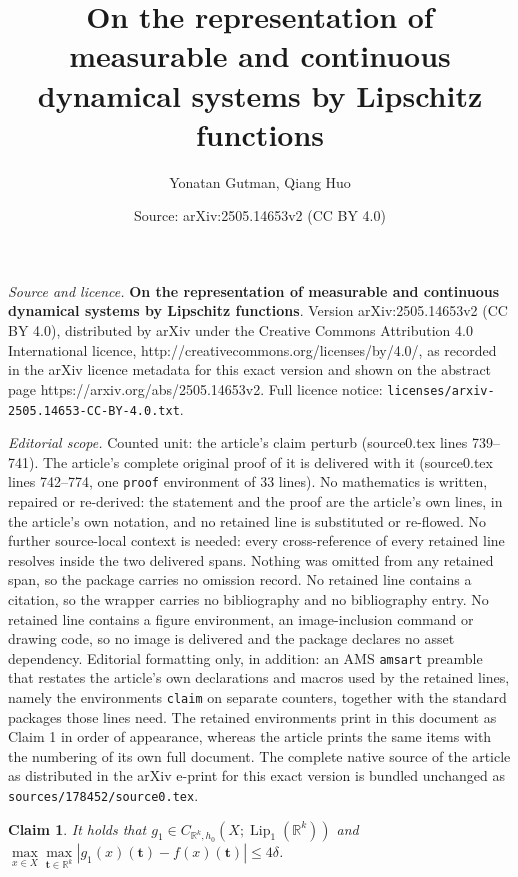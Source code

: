 \documentclass[10pt,a4paper]{amsart}
\title{{ \Large\bf{On the representation of measurable and continuous dynamical systems by Lipschitz functions}}}
\author{Yonatan Gutman, Qiang Huo}
\date{Source: arXiv:2505.14653v2 (CC BY 4.0)}
\newtheorem{claim}{Claim}
\DeclareMathOperator{\Lip}{Lip}
\def\Rk{\mathbb{R}^k}
\def\tt{\mathbf t}
\begin{document}
\maketitle

\noindent\emph{Source and licence.} { \Large\bf{On the representation of measurable and continuous dynamical systems by Lipschitz functions}}. Version arXiv:2505.14653v2 (CC BY 4.0), distributed by arXiv under the Creative Commons Attribution 4.0 International licence, http://creativecommons.org/licenses/by/4.0/, as recorded in the arXiv licence metadata for this exact version and shown on the abstract page https://arxiv.org/abs/2505.14653v2. Full licence notice: \texttt{licenses/arxiv-2505.14653-CC-BY-4.0.txt}.\par\smallskip

\noindent\textit{Editorial scope.} Counted unit: the article's claim perturb (source0.tex lines 739--741). The article's complete original proof of it is delivered with it (source0.tex lines 742--774, one \texttt{proof} environment of 33 lines). No mathematics is written, repaired or re-derived: the statement and the proof are the article's own lines, in the article's own notation, and no retained line is substituted or re-flowed.  No further source-local context is needed: every cross-reference of every retained line resolves inside the two delivered spans.  Nothing was omitted from any retained span, so the package carries no omission record.  No retained line contains a citation, so the wrapper carries no bibliography and no bibliography entry.  No retained line contains a figure environment, an image-inclusion command or drawing code, so no image is delivered and the package declares no asset dependency.  Editorial formatting only, in addition: an AMS \texttt{amsart} preamble that restates the article's own declarations and macros used by the retained lines, namely the environments \texttt{claim} on separate counters, together with the standard packages those lines need.  The retained environments print in this document as Claim 1 in order of appearance, whereas the article prints the same items with the numbering of its own full document.  The complete native source of the article as distributed in the arXiv e-print for this exact version is bundled unchanged as \texttt{sources/178452/source0.tex}.
    \begin{claim}\label{equi and perturb}
It holds that  $g_1\in C_{\Rk,h_0}(X;\Lip_{1}(\Rk))$ and $\max\limits_{x\in X}\max\limits_{\mathbf t\in\Rk}|g_1(x)(\tt)-f(x)(\tt)|\leq 4\delta$. 
    \end{claim}
\end{document}

